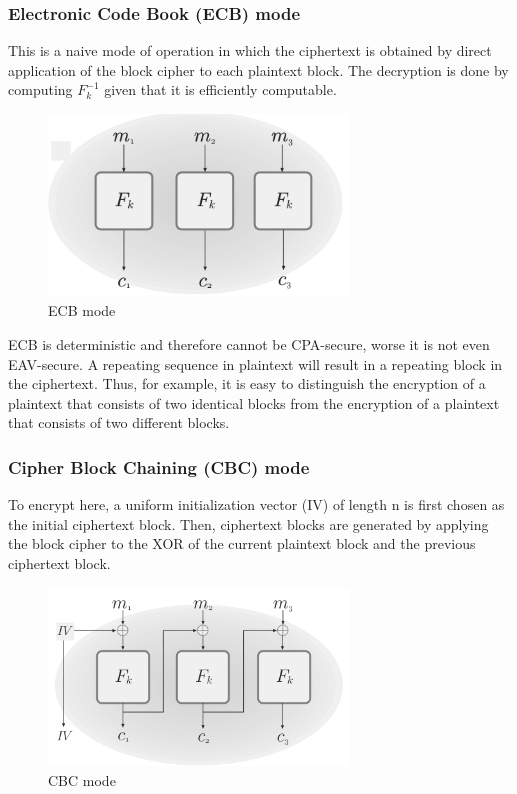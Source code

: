 \documentclass[12pt]{article}
\begin{document}
\subsubsection{Electronic Code Book (ECB) mode}
This is a naive mode of operation in which the ciphertext is obtained by direct application of the block cipher to each plaintext block. The decryption is done by computing $F_k^{-1}$ given that it is efficiently computable. 
\begin{figure}[ht]
    \centering
    \includegraphics[width=8cm]{figures/f2.png}
    \caption{ECB mode}
\end{figure}
ECB is deterministic and therefore cannot be CPA-secure, worse it is not even EAV-secure. A repeating sequence in plaintext will result in a repeating block in the ciphertext. Thus, for example, it is easy to distinguish the encryption of a plaintext that consists of two identical blocks from the encryption of a plaintext that consists of two diﬀerent blocks.
\newpage
\subsubsection{Cipher Block Chaining (CBC) mode}
To encrypt here, a uniform initialization vector (IV) of length n is first chosen as the initial ciphertext block. Then, ciphertext blocks are generated by applying the block cipher to the XOR of the current plaintext block and the previous ciphertext block.
\begin{figure}[h]
    \centering
    \includegraphics[width=8cm]{figures/f3.png}
    \caption{CBC mode}
\end{figure}
\end{document}
